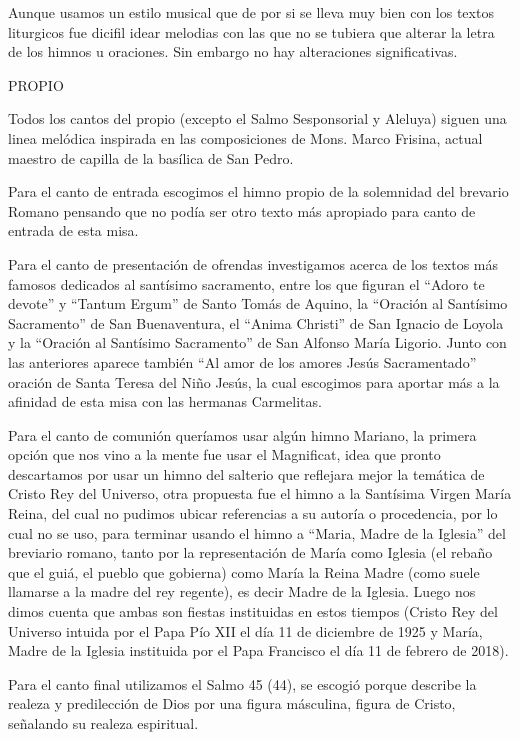 \documentclass[12pt, letterpaper]{report}
\begin{document}
    Aunque usamos un estilo musical que de por si se lleva muy bien con los textos liturgicos fue dicifil idear melodias con
    las que no se tubiera que alterar la letra de los himnos u oraciones. Sin embargo no hay alteraciones significativas.

    \LARGE PROPIO

    \Large Todos los cantos del propio (excepto el Salmo Sesponsorial y Aleluya) siguen una linea mel\'odica inspirada en las composiciones
    de Mons. Marco Frisina, actual maestro de capilla de la bas\'ilica de San Pedro.

    Para el canto de entrada escogimos el himno propio de la solemnidad del brevario Romano pensando que no pod\'ia ser otro texto
    m\'as apropiado para canto de entrada de esta misa.

    Para el canto de presentaci\'on de ofrendas investigamos acerca de los textos m\'as famosos dedicados al sant\'isimo sacramento,
    entre los que figuran el ``Adoro te devote'' y ``Tantum Ergum'' de Santo Tom\'as de Aquino, la ``Oraci\'on al Sant\'isimo Sacramento''
    de San Buenaventura, el ``Anima Christi'' de San Ignacio de Loyola y la ``Oraci\'on al Sant\'isimo Sacramento'' de San Alfonso Mar\'ia Ligorio.
    Junto con las anteriores aparece tambi\'en ``Al amor de los amores Jes\'us Sacramentado'' oraci\'on de Santa Teresa del Ni\~no Jes\'us,
    la cual escogimos para aportar m\'as a la afinidad de esta misa con las hermanas Carmelitas.

    Para el canto de comuni\'on quer\'iamos usar alg\'un himno Mariano, la primera opci\'on que nos vino a la mente fue usar el Magnificat,
    idea que pronto descartamos por usar un himno del salterio que reflejara mejor la tem\'atica de Cristo Rey del Universo, otra propuesta
    fue el himno a la Sant\'isima Virgen Mar\'ia Reina, del cual no pudimos ubicar referencias a su autor\'ia o procedencia, por lo cual no se uso,
    para terminar usando el himno a ``Maria, Madre de la Iglesia'' del breviario romano, tanto por la representaci\'on de Mar\'ia como Iglesia
    (el reba\~no que el gui\'a, el pueblo que gobierna) como Mar\'ia la Reina Madre (como suele llamarse a la madre del rey regente), es decir
    Madre de la Iglesia. Luego nos dimos cuenta que ambas son fiestas instituidas en estos tiempos (Cristo Rey del Universo intuida por
    el Papa P\'io XII el d\'ia 11 de diciembre de 1925 y Mar\'ia, Madre de la Iglesia instituida por el Papa Francisco el d\'ia 11 de febrero de 2018).

    Para el canto final utilizamos el Salmo 45 (44), se escogi\'o porque describe la realeza y predilecci\'on de Dios por una figura
    m\'asculina, figura de Cristo, se\~nalando su realeza espiritual.
\end{document}

